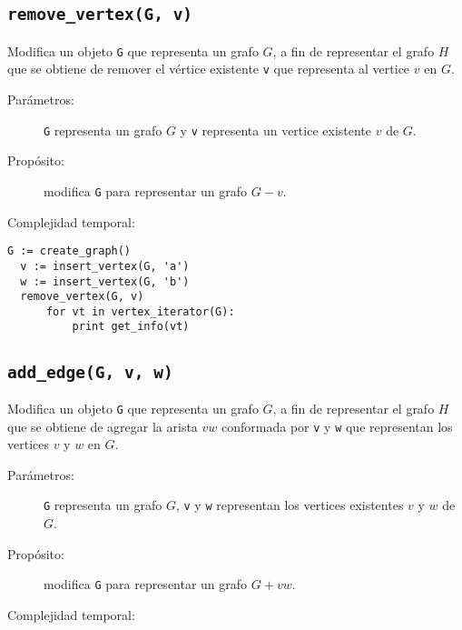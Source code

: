 \documentclass[a4paper,12pt]{article}
\makeatletter
\newcommand{\Code}[1]{\lstinline[basicstyle={\tt}]@#1@}
\makeatother
\begin{document}
\subsection{\texttt{remove\_vertex(G, v)}}
\label{sec:tad grafo:remove-vertex}

Modifica un objeto \Code{G} que representa un grafo $G$, a fin de representar el grafo $H$ que se obtiene de remover el vértice existente \Code{v} que representa al vertice $v$ en $G$.
  
\begin{description}
  \item [Parámetros:] \Code{G} representa un grafo $G$ y \Code{v} representa un vertice existente $v$ de $G$.
  \item [Propósito:] modifica \Code{G} para representar un grafo $G - v$.
  \item [Complejidad temporal:]
\end{description}


\begin{lstlisting}[caption={Ejemplo de uso de remove\_vertex. El código crea un grafo $G$ con dos vértices, el primero \texttt{v} representa al vértice $v$ con la letra 'a' y el segundo \texttt{w} representa al vértice $w$ con la letra 'b' como infomación. Luego, remueve \texttt{v} del grafo y el ciclo imprime ``b'' como resultado. Ver Sección~\ref{sec:tad grafo:vertex-iterator} para más información de \texttt{vertex\_iterator}.},gobble=2,float=ht,label={lst:pseudo:remove_vertex},emph={remove_vertex}]
  G := create_graph()
  v := insert_vertex(G, 'a')
  w := insert_vertex(G, 'b')
  remove_vertex(G, v)
      for vt in vertex_iterator(G):
          print get_info(vt)
\end{lstlisting}


\subsection{\texttt{add\_edge(G, v, w)}}
\label{sec:tad grafo:add-edge}

Modifica un objeto \Code{G} que representa un grafo $G$, a fin de representar el grafo $H$ que se obtiene de agregar la arista $vw$ conformada por \Code{v} y \Code{w} que representan los vertices $v$ y $w$ en $G$.

\begin{description}
  \item [Parámetros:] \Code{G} representa un grafo $G$, \Code{v} y \Code{w} representan los vertices existentes $v$ y $w$ de $G$.
  \item [Propósito:] modifica \Code{G} para representar un grafo $G + vw$.
  \item [Complejidad temporal:]
\end{description}
\end{document}

